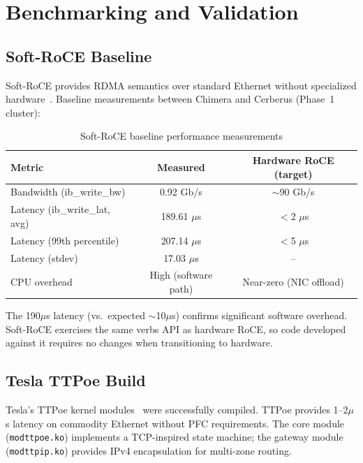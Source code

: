 \documentclass[11pt,letterpaper]{article}
\theoremstyle{definition}
\begin{document}
\section{Benchmarking and Validation}
\label{sec:benchmarks}

\subsection{Soft-RoCE Baseline}
\label{sec:softroce-baseline}

Soft-RoCE provides RDMA semantics over standard Ethernet without specialized hardware~\cite{rdma-core}. Baseline measurements between Chimera and Cerberus (Phase~1 cluster):

\begin{table}[htbp]
\centering
\caption{Soft-RoCE baseline performance measurements}
\label{tab:softroce-results}
\begin{tabular}{@{}lcc@{}}
\toprule
\textbf{Metric} & \textbf{Measured} & \textbf{Hardware RoCE (target)} \\
\midrule
Bandwidth (ib\_write\_bw) & 0.92 Gb/s & $\sim$90 Gb/s \\
Latency (ib\_write\_lat, avg) & 189.61 $\mu$s & $<$2 $\mu$s \\
Latency (99th percentile) & 207.14 $\mu$s & $<$5 $\mu$s \\
Latency (stdev) & 17.03 $\mu$s & -- \\
CPU overhead & High (software path) & Near-zero (NIC offload) \\
\bottomrule
\end{tabular}
\end{table}

The 190$\mu$s latency (vs.\ expected $\sim$10$\mu$s) confirms significant software overhead. Soft-RoCE exercises the same verbs API as hardware RoCE, so code developed against it requires no changes when transitioning to hardware.

\subsection{Tesla TTPoe Build}

Tesla's TTPoe kernel modules~\cite{ttpoe-repo,ttpoe-hotchips} were successfully compiled. TTPoe provides 1--2$\mu$s latency on commodity Ethernet without PFC requirements. The core module (\texttt{modttpoe.ko}) implements a TCP-inspired state machine; the gateway module (\texttt{modttpip.ko}) provides IPv4 encapsulation for multi-zone routing.
\end{document}
